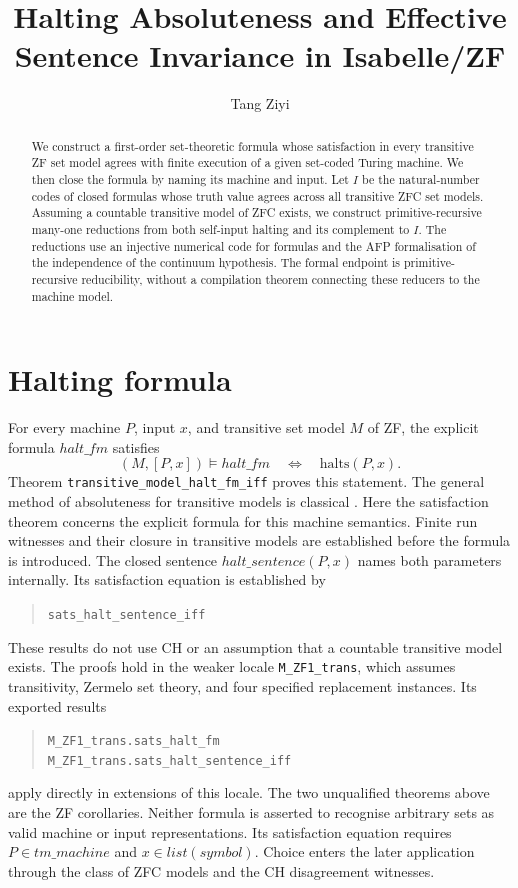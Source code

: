 \documentclass[11pt,a4paper]{article}
\newcommand{\theoremname}[1]{{\urlstyle{tt}\nolinkurl{#1}}}
\begin{document}

\title{Halting Absoluteness and Effective Sentence Invariance in Isabelle/ZF}
\author{Tang Ziyi}
\maketitle

\begin{abstract}
We construct a first-order set-theoretic formula whose satisfaction in every
transitive ZF set model agrees with finite execution of a given set-coded
Turing machine. We then close the formula by naming its machine and input.
Let $I$ be the natural-number codes of closed formulas whose truth value
agrees across all transitive ZFC set models. Assuming a countable transitive model of
ZFC exists, we construct primitive-recursive many-one reductions from both
self-input halting and its complement to $I$. The reductions use an
injective numerical code for formulas and the AFP formalisation of the
independence of the continuum hypothesis. The formal endpoint is
primitive-recursive reducibility, without a compilation theorem connecting
these reducers to the machine model.
\end{abstract}

\tableofcontents
\clearpage
{}

\section{Halting formula}
For every machine $P$, input $x$, and transitive set model $M$ of ZF, the
explicit formula $\mathit{halt\_fm}$ satisfies
\[
  (M,[P,x])\models\mathit{halt\_fm}
  \quad\Longleftrightarrow\quad
  \mathrm{halts}(P,x).
\]
Theorem \theoremname{transitive_model_halt_fm_iff} proves this statement.
The general method of absoluteness for transitive models is classical
\cite[Chapter~12]{jech}. Here the satisfaction theorem concerns the explicit
formula for this machine semantics. Finite run witnesses and their closure
in transitive models are established before the formula is introduced. The
closed sentence $\mathit{halt\_sentence}(P,x)$ names both parameters
internally. Its satisfaction equation is established by
\begin{quote}
\small\theoremname{sats_halt_sentence_iff}
\end{quote}
These results do not use CH or an assumption that a countable transitive
model exists.
The proofs hold in the weaker locale \texttt{M\_ZF1\_trans}, which
assumes transitivity, Zermelo set theory, and four specified replacement
instances. Its exported results
\begin{quote}
\small\theoremname{M_ZF1_trans.sats_halt_fm}\\
\theoremname{M_ZF1_trans.sats_halt_sentence_iff}
\end{quote}
apply directly in extensions of this locale. The two unqualified theorems
above are the ZF corollaries. Neither formula is asserted to recognise
arbitrary sets as valid machine or input representations. Its satisfaction
equation requires $P\in\mathit{tm\_machine}$ and
$x\in\mathit{list}(\mathit{symbol})$.
Choice enters the later application through the class of ZFC models and the CH disagreement
witnesses.
\end{document}
